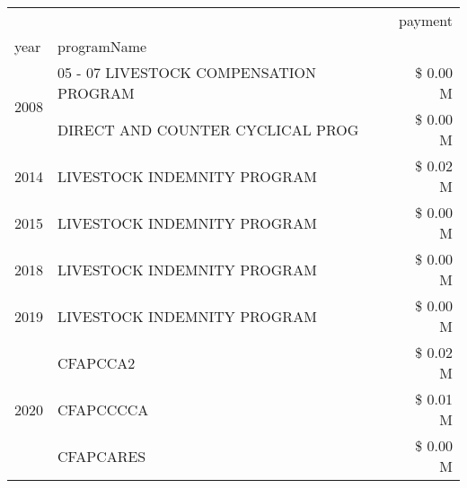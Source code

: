\begin{tabular}{llr}
\toprule
 &  & payment \\
year & programName &  \\
\midrule
\multirow[t]{2}{*}{2008} & 05 - 07 LIVESTOCK COMPENSATION PROGRAM & \$ 0.00 M \\
 & DIRECT AND COUNTER CYCLICAL PROG & \$ 0.00 M \\
\cline{1-3}
2014 & LIVESTOCK INDEMNITY PROGRAM & \$ 0.02 M \\
\cline{1-3}
2015 & LIVESTOCK INDEMNITY PROGRAM & \$ 0.00 M \\
\cline{1-3}
2018 & LIVESTOCK INDEMNITY PROGRAM & \$ 0.00 M \\
\cline{1-3}
2019 & LIVESTOCK INDEMNITY PROGRAM & \$ 0.00 M \\
\cline{1-3}
\multirow[t]{3}{*}{2020} & CFAPCCA2 & \$ 0.02 M \\
 & CFAPCCCCA & \$ 0.01 M \\
 & CFAPCARES & \$ 0.00 M \\
\cline{1-3}
\bottomrule
\end{tabular}
